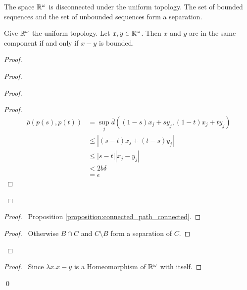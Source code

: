 \begin{example}
    The space $\mathbb{R}^\omega$ is disconnected under the uniform topology. The set of bounded sequences and the set of unbounded sequences form a separation.
\end{example}

\begin{proposition}
    Give $\mathbb{R}^\omega$ the uniform topology. Let $x, y \in \mathbb{R}^\omega$. Then $x$ and $y$ are in the same component if and only if $x-y$ is bounded.
\end{proposition}

\begin{proof}
    \pf
    \begin{proof}
        \begin{proof}
            \begin{proof}
                \pf
                \begin{align*}
                    \overline{\rho}(p(s),p(t)) & = \sup_j \overline{d}((1-s)x_j + sy_j, (1-t)x_j + ty_j) \\
                    & \leq |(s-t)x_j + (t-s)y_j| \\
                    & \leq |s-t| |x_j - y_j| \\
                    & < 2b \delta \\
                    & = \epsilon
                \end{align*}
            \end{proof}
        \end{proof}
        \begin{proof}
            \pf\ Proposition \ref{proposition:connected_path_connected}.
        \end{proof}
        \begin{proof}
            \pf\ Otherwise $B \cap C$ and $C \setminus B$ form a separation of $C$.
        \end{proof}
    \end{proof}
    \qedstep
    \begin{proof}
        \pf\ Since $\lambda x. x-y$ is a Homeomorphism of $\mathbb{R}^\omega$ with itself.
    \end{proof}
    \qed
\end{proof}


